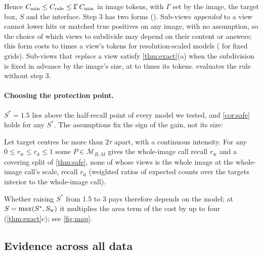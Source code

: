 Hence $C_{\min} \le C_{\mathrm{rule}} \le \Gamma\,C_{\min}$ in image tokens, with $\Gamma$ set by the image, the target box, $S$ and the interface. Step 3 has two forms (). Sub-views \emph{appended} to a view cannot lower hits or matched true positives on any image, with no assumption, so the choice of which views to subdivide may depend on their content or answers; this form costs \CstepAppMin{} to \CstepAppMax{} times a view's tokens for resolution-scaled models (\CstepGridApp{} for fixed grids). Sub-views that \emph{replace} a view satisfy \cref{thm:exact}(a) when the subdivision is fixed in advance by the image's size, at \CstepRepMin{} to \CstepRepMax{} times its tokens.  evaluates the rule without step 3.

\paragraph{Choosing the protection point.} $S^\ast = 1.5$ lies above the half-recall point of every model we tested, and \cref{cor:safe} holds for any $S^\ast$. The assumptions fix the sign of the gain, not its size:

\begin{proposition}
\label{prop:nonid}
Let target centres be more than $2\tau$ apart, with a continuous intensity. For any $0 \le r_{\mathrm{w}} \le r_{\mathrm{d}} \le 1$ some $P \in \mathcal{M}_{R,M}$ gives the whole-image call recall $r_{\mathrm{w}}$ and a covering split of \cref{thm:safe}, none of whose views is the whole image at the whole-image call's scale, recall $r_{\mathrm{d}}$ (weighted ratios of expected counts over the targets interior to the whole-image call).
\end{proposition}

Whether raising $S^\ast$ from 1.5 to 3 pays therefore depends on the model; at $S = \max(S^\ast, S_{\mathrm{w}})$ it multiplies the area term of the cost by up to four (\cref{thm:exact}c); see \cref{fig:map}.

\subsection{Evidence across all data}

